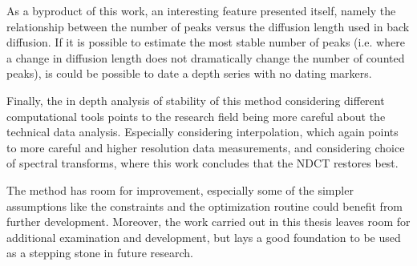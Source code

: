\documentclass[../../CompleteThesis2/Complete_2ndDraft]{subfiles}
\begin{document}
As a byproduct of this work, an interesting feature presented itself, namely the relationship between the number of peaks versus the diffusion length used in back diffusion. If it is possible to estimate the most stable number of peaks (i.e. where a change in diffusion length does not dramatically change the number of counted peaks), is could be possible to date a depth series with no dating markers.

Finally, the in depth analysis of stability of this method considering different computational tools points to the research field being more careful about the technical data analysis. Especially considering interpolation, which again points to more careful and higher resolution data measurements, and considering choice of spectral transforms, where this work concludes that the NDCT restores best.

The method has room for improvement, especially some of the simpler assumptions like the constraints and the optimization routine could benefit from further development. Moreover, the work carried out in this thesis leaves room for additional examination and development, but lays a good foundation to be used as a stepping stone in future research.
\end{document}
